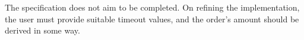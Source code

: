 The specification does not aim to be completed. On refining the implementation,
the user must provide suitable timeout values, and 
the order's amount should be derived in some way.


